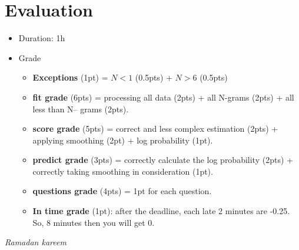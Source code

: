 \documentclass[11pt, a4paper]{article}
\begin{document}
\section{Evaluation}

\begin{itemize}
	\item Duration: 1h
	\item Grade
	\begin{itemize}
		\item \textbf{Exceptions} (1pt) = $ N < 1 $ (0.5pts) + $ N > 6 $ (0.5pts)
		\item \textbf{fit grade} (6pts) = processing all data (2pts) + all N-grams (2pts) + all less than N-- grams (2pts).
		\item \textbf{score grade} (5pts) = correct and less complex estimation (2pts) + applying smoothing (2pt) + log probability (1pt).
		\item \textbf{predict grade} (3pts) = correctly calculate the log probability (2pts) + correctly taking smoothing in consideration (1pt).
		\item \textbf{questions grade} (4pts) = 1pt for each question.
		\item \textbf{In time grade} (1pt): after the deadline, each late 2 minutes are -0.25. So, 8 minutes then you will get 0.
	\end{itemize}
\end{itemize}

\vfill
\begin{flushright}
	\textit{Ramadan kareem}
\end{flushright}
\end{document}
